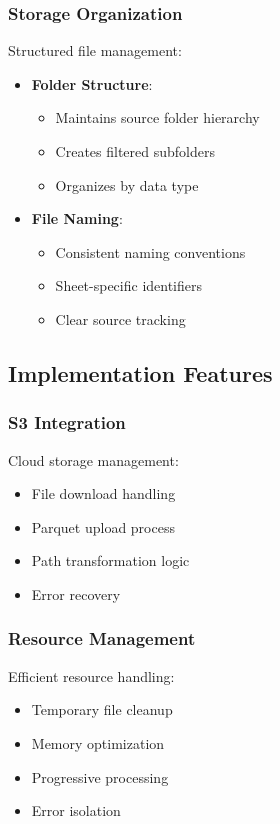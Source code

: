 \subsubsection{Storage Organization}
Structured file management:
\begin{itemize}
    \item \textbf{Folder Structure}:
    \begin{itemize}
        \item Maintains source folder hierarchy
        \item Creates filtered subfolders
        \item Organizes by data type
    \end{itemize}
    
    \item \textbf{File Naming}:
    \begin{itemize}
        \item Consistent naming conventions
        \item Sheet-specific identifiers
        \item Clear source tracking
    \end{itemize}
\end{itemize}

\subsection{Implementation Features}

\subsubsection{S3 Integration}
Cloud storage management:
\begin{itemize}
    \item File download handling
    \item Parquet upload process
    \item Path transformation logic
    \item Error recovery
\end{itemize}

\subsubsection{Resource Management}
Efficient resource handling:
\begin{itemize}
    \item Temporary file cleanup
    \item Memory optimization
    \item Progressive processing
    \item Error isolation
\end{itemize}

